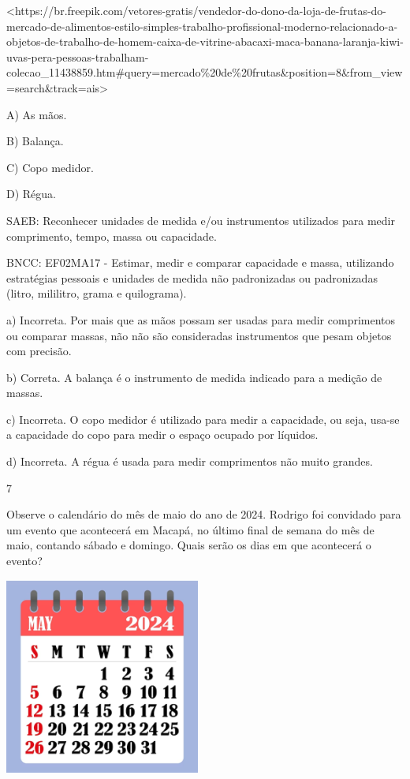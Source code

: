 \begin{escolha}
\begin{escolha}
{{{{\textless{}https://br.freepik.com/vetores-gratis/vendedor-do-dono-da-loja-de-frutas-do-mercado-de-alimentos-estilo-simples-trabalho-profissional-moderno-relacionado-a-objetos-de-trabalho-de-homem-caixa-de-vitrine-abacaxi-maca-banana-laranja-kiwi-uvas-pera-pessoas-trabalham-colecao\_11438859.htm\#query=mercado\%20de\%20frutas\&position=8\&from\_view=search\&track=ais\textgreater{}

A) As mãos.

B) Balança.

C) Copo medidor.

D) Régua.

SAEB: Reconhecer unidades de medida e/ou instrumentos utilizados
para medir comprimento, tempo, massa ou capacidade.

BNCC: EF02MA17 - Estimar, medir e comparar capacidade
e massa, utilizando estratégias pessoais e unidades de medida não
padronizadas ou padronizadas (litro, mililitro, grama e quilograma).

a) Incorreta. Por mais que as mãos possam ser usadas para medir
comprimentos ou comparar massas, não não são consideradas instrumentos que
pesam objetos com precisão.

b) Correta. A balança é o instrumento de medida indicado para a medição de massas.

c) Incorreta. O copo medidor é utilizado para medir a capacidade, ou
seja, usa-se a capacidade do copo para medir o espaço ocupado por líquidos.

d) Incorreta. A régua é usada para medir comprimentos não muito grandes.

\num{7}

Observe o calendário do mês de maio do ano de 2024. Rodrigo foi
convidado para um evento que acontecerá em Macapá, no último final de
semana do mês de maio, contando sábado e domingo. Quais serão os dias em que acontecerá o evento?

\includegraphics[width=2.53108in,height=2.54167in]{media/image167.png}

}}}}
\end{escolha}
\end{escolha}
